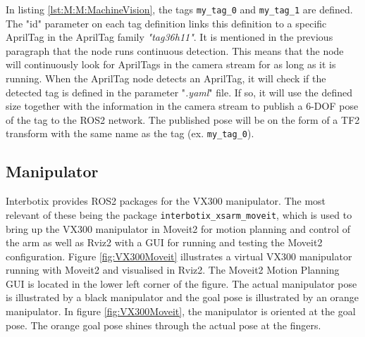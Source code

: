 In listing \ref{lst:M:M:MachineVision}, the tags \lstinline{my_tag_0} and \lstinline{my_tag_1} are defined. The "id" parameter on each tag definition links this definition to a specific AprilTag in the AprilTag family \textit{"tag36h11"}. It is mentioned in the previous paragraph that the node runs continuous detection. This means that the node will continuously look for AprilTags in the camera stream for as long as it is running. When the AprilTag node detects an AprilTag, it will check if the detected tag is defined in the parameter "\textit{.yaml}" file. If so, it will use the defined size together with the information in the camera stream to publish a 6-DOF pose of the tag to the ROS2 network. The published pose will be on the form of a TF2 transform with the same name as the tag (ex. \lstinline{my_tag_0}).

\subsection{Manipulator}\label{sec:M:MRC:Manipulator}
Interbotix provides ROS2 packages for the VX300 manipulator. The most relevant of these being the package \lstinline{interbotix_xsarm_moveit}, which is used to bring up the VX300 manipulator in Moveit2 for motion planning and control of the arm as well as Rviz2 with a GUI for running and testing the Moveit2 configuration. Figure \ref{fig:VX300Moveit} illustrates a virtual VX300 manipulator running with Moveit2 and visualised in Rviz2. The Moveit2 Motion Planning GUI is located in the lower left corner of the figure. The actual manipulator pose is illustrated by a black manipulator and the goal pose is illustrated by an orange manipulator. In figure \ref{fig:VX300Moveit}, the manipulator is oriented at the goal pose. The orange goal pose shines through the actual pose at the fingers.

